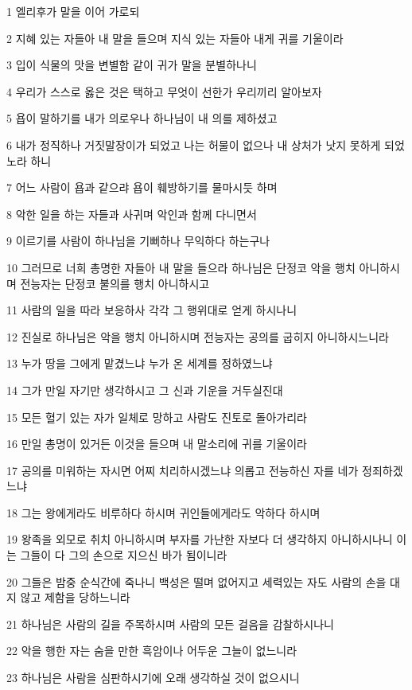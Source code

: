 \par 1 엘리후가 말을 이어 가로되
\par 2 지혜 있는 자들아 내 말을 들으며 지식 있는 자들아 내게 귀를 기울이라
\par 3 입이 식물의 맛을 변별함 같이 귀가 말을 분별하나니
\par 4 우리가 스스로 옳은 것은 택하고 무엇이 선한가 우리끼리 알아보자
\par 5 욥이 말하기를 내가 의로우나 하나님이 내 의를 제하셨고
\par 6 내가 정직하나 거짓말장이가 되었고 나는 허물이 없으나 내 상처가 낫지 못하게 되었노라 하니
\par 7 어느 사람이 욥과 같으랴 욥이 훼방하기를 물마시듯 하며
\par 8 악한 일을 하는 자들과 사귀며 악인과 함께 다니면서
\par 9 이르기를 사람이 하나님을 기뻐하나 무익하다 하는구나
\par 10 그러므로 너희 총명한 자들아 내 말을 들으라 하나님은 단정코 악을 행치 아니하시며 전능자는 단정코 불의를 행치 아니하시고
\par 11 사람의 일을 따라 보응하사 각각 그 행위대로 얻게 하시나니
\par 12 진실로 하나님은 악을 행치 아니하시며 전능자는 공의를 굽히지 아니하시느니라
\par 13 누가 땅을 그에게 맡겼느냐 누가 온 세계를 정하였느냐
\par 14 그가 만일 자기만 생각하시고 그 신과 기운을 거두실진대
\par 15 모든 혈기 있는 자가 일체로 망하고 사람도 진토로 돌아가리라
\par 16 만일 총명이 있거든 이것을 들으며 내 말소리에 귀를 기울이라
\par 17 공의를 미워하는 자시면 어찌 치리하시겠느냐 의롭고 전능하신 자를 네가 정죄하겠느냐
\par 18 그는 왕에게라도 비루하다 하시며 귀인들에게라도 악하다 하시며
\par 19 왕족을 외모로 취치 아니하시며 부자를 가난한 자보다 더 생각하지 아니하시나니 이는 그들이 다 그의 손으로 지으신 바가 됨이니라
\par 20 그들은 밤중 순식간에 죽나니 백성은 떨며 없어지고 세력있는 자도 사람의 손을 대지 않고 제함을 당하느니라
\par 21 하나님은 사람의 길을 주목하시며 사람의 모든 걸음을 감찰하시나니
\par 22 악을 행한 자는 숨을 만한 흑암이나 어두운 그늘이 없느니라
\par 23 하나님은 사람을 심판하시기에 오래 생각하실 것이 없으시니

